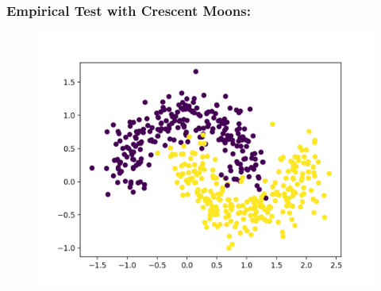 \documentclass{beamer}
\begin{document}
\begin{frame}
    \frametitle{Empirical Test with Crescent Moons:}

    \begin{figure}[H]
        \centering
          \includegraphics[width=0.8\linewidth]{moons}
      \end{figure}
\end{frame}
\end{document}
